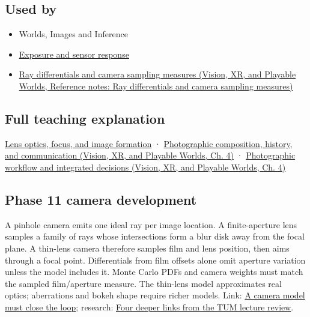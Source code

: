 \subsection{Used by}\label{appendix-21f8456e2629-used-by}

\begin{itemize}
\item
  {Worlds, Images and Inference}
\item
  \hyperref[appendix-92d45cdf2afc]{Exposure and sensor response}
\item
  \href{../07-Vision-XR-and-Playable-Worlds/main.pdf\#nameddest=appendix-8c40fad29462}{Ray differentials and camera sampling measures (Vision, XR, and Playable Worlds, Reference notes: Ray differentials and camera sampling measures)}
\end{itemize}

\subsection{Full teaching explanation}\label{appendix-21f8456e2629-full-teaching-explanation}

\hyperref[03-visual-computing-i-ch003-lens-optics-focus-and-image-formation]{Lens optics, focus, and image formation} · \href{../07-Vision-XR-and-Playable-Worlds/main.pdf\#nameddest=04-visual-computing-ii-ch034-photographic-composition-history-and-communication}{Photographic composition, history, and communication (Vision, XR, and Playable Worlds, Ch. 4)} · \href{../07-Vision-XR-and-Playable-Worlds/main.pdf\#nameddest=04-visual-computing-ii-ch034-photographic-workflow-and-integrated-decisions}{Photographic workflow and integrated decisions (Vision, XR, and Playable Worlds, Ch. 4)}

\subsection{Phase 11 camera development}\label{appendix-21f8456e2629-phase-11-camera-development}

A pinhole camera emits one ideal ray per image location. A finite-aperture lens samples a family of rays whose intersections form a blur disk away from the focal plane. A thin-lens camera therefore samples film and lens position, then aims through a focal point. Differentials from film offsets alone omit aperture variation unless the model includes it. Monte Carlo PDFs and camera weights must match the sampled film/aperture measure. The thin-lens model approximates real optics; aberrations and bokeh shape require richer models. Link: \hyperref[02-foundations-ii-ch037-a-camera-model-must-close-the-loop]{A camera model must close the loop}; research: \hyperref[02-foundations-ii-ch036-four-deeper-links-from-the-tum-lecture-review]{Four deeper links from the TUM lecture review}.
